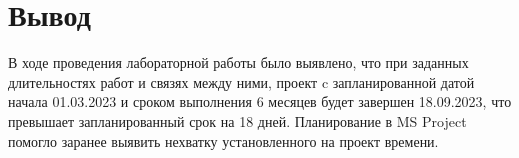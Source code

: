 \section{Вывод}

В ходе проведения лабораторной работы было выявлено, что при заданных
длительностях работ и связях между ними, проект c запланированной датой начала
01.03.2023 и сроком выполнения 6 месяцев будет завершен 18.09.2023, что
превышает запланированный срок на 18 дней. Планирование в MS Project помогло
заранее выявить нехватку установленного на проект времени.
